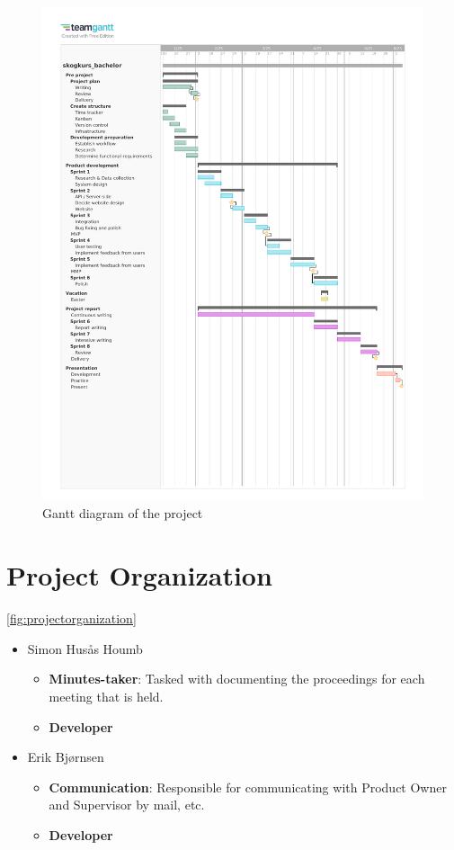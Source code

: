\begin{figure}[h]
    \centering
        \includegraphics[width=1.0\linewidth, trim=0 60mm 0 20mm, clip]{figures/skogkurs_bachelor_gantt.pdf}
    \caption{Gantt diagram of the project}
    \label{fig:gantt_diagram}
\end{figure}

\section{Project Organization}

\autoref{fig:projectorganization}
\begin{itemize}
    \item Simon Husås Houmb
    \begin{itemize}
        \item \textbf{Minutes-taker}: Tasked with documenting the proceedings for each meeting that is held.
        \item \textbf{Developer}
    \end{itemize}
    \item Erik Bjørnsen
    \begin{itemize}
        \item \textbf{Communication}: Responsible for communicating with Product Owner and Supervisor by mail, etc.
        \item \textbf{Developer}
    \end{itemize}
\end{itemize}

